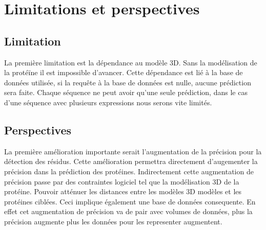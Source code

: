 \section{Limitations et perspectives}
\subsection{Limitation}
La première limitation est la dépendance au modèle 3D. Sans la modélisation de la protéïne il est impossible d'avancer. Cette dépendance est lié à la base de données utilisée, si la requête à la base de données est nulle, aucune prédiction sera faite.
\newline
Chaque séquence ne peut avoir qu'une seule prédiction, dans le cas d'une séquence avec plusieurs expressions nous serons vite limités.
\subsection{Perspectives}
La première amélioration importante serait l'augmentation de la précision pour la détection des résidus. Cette amélioration permettra directement d'augementer la précision dans la prédiction des protéines. Indirectement cette augmentation de précision passe par des contraintes logiciel tel que la modélisation 3D de la protéine. Pouvoir atténuer les distances entre les modèles  3D modèles et les protéines ciblées.
\newline
Ceci implique également une base de données consequente. En effet cet augmentation de précision va de pair avec volumes de données, plus la précision augmente plus les données pour les representer augmentent.
